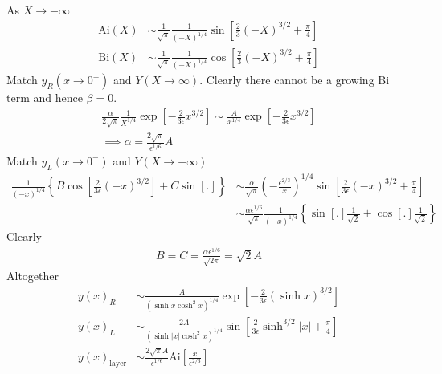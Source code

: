 As $X \rightarrow -\infty$
\begin{align*}
	\mathrm{Ai}(X) &\sim \frac{1}{\sqrt{\pi}} \frac{1}{(-X)^{1/4}} \sin \left[\frac{2}{3}(-X)^{3/2} + \frac{\pi}{4}\right] \\
	\mathrm{Bi}(X) &\sim \frac{1}{\sqrt{\pi}} \frac{1}{(-X)^{1/4}} \cos \left[\frac{2}{3}(-X)^{3/2} + \frac{\pi}{4}\right]	
\end{align*}
Match $y_R(x \rightarrow 0^+)$ and $Y(X \rightarrow \infty)$. Clearly there cannot be a growing $\mathrm{Bi}$ term and hence $\beta=0$.
\begin{gather*}
	 \frac{\alpha}{2 \sqrt{\pi}} \frac{1}{X^{1/4}} \exp \left[-\frac{2}{3\epsilon}x^{3/2} \right]\sim \frac{A}{x^{1/4}} \exp\left[-\frac{2}{3 \epsilon} x^{3/2}\right] \\
	 \implies \alpha = \frac{2 \sqrt{\pi}}{\epsilon^{1/6}} A 
\end{gather*}
Match $y_L(x \rightarrow 0^-)$ and $Y(X \rightarrow -\infty)$
\begin{align*}
	\frac{1}{(-x)^{1/4}} \left\{ B \cos \left[\frac{2}{3 \epsilon}(-x)^{3/2}\right]  + C \sin \left[.\right] \right\} &\sim \frac{\alpha}{\sqrt{\pi}} \left(-\frac{\epsilon^{2/3}}{x}\right)^{1/4}\sin \left[\frac{2}{3 \epsilon}\left(-x\right)^{3/2} + \frac{\pi}{4}\right] \\
	& \sim \frac{\alpha \epsilon^{1/6}}{\sqrt{\pi}}\frac{1}{(-x)^{1/4}} \left\{ \sin [.] \frac{1}{\sqrt{2}} + \cos [.] \frac{1}{\sqrt{2}} \right\}
\end{align*} 
Clearly
\begin{gather*}
	B = C = \frac{\alpha \epsilon^{1/6}}{\sqrt{2\pi}} = \sqrt{2} A
\end{gather*}
Altogether
\begin{align*}
	y(x)_R &\sim \frac{A}{(\sinh x \cosh^2 x)^{1/4}} \exp\left[-\frac{2}{3\epsilon}(\sinh x)^{3/2}\right]  \\
	y(x)_L & \sim \frac{2A}{(\sinh |x| \cosh^2 x)^{1/4}} \sin\left[\frac{2}{3\epsilon}\sinh^{3/2} |x| + \frac{\pi}{4}\right] \\
	y(x)_\text{layer} & \sim \frac{2 \sqrt{\pi}A}{\epsilon^{1/6}} \mathrm{Ai} \left[\frac{x}{\epsilon^{2/3}}\right]
\end{align*}






